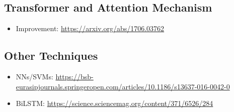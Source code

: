 \subsection{Transformer and Attention Mechanism} \label{fundamentalsG}

\begin{itemize}
	\item Improvement: \url{https://arxiv.org/abs/1706.03762}
\end{itemize}


\subsection{Other Techniques} \label{fundamentalsH}

\begin{itemize}
	\item NNs/SVMs: \url{https://bsb-eurasipjournals.springeropen.com/articles/10.1186/s13637-016-0042-0}
	\item BiLSTM: \url{https://science.sciencemag.org/content/371/6526/284}
\end{itemize}


\newpage
